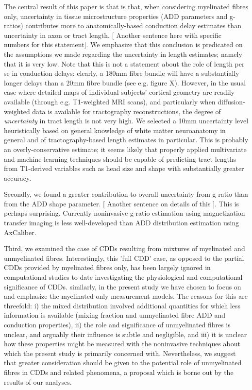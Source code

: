 The central result of this paper is that is that, when considering myelinated fibres only, uncertainty in tissue microstructure properties (ADD parameters and g-ratios) contributes more to anatomically-based conduction delay estimates than uncertainty in axon or tract length. [ Another sentence here with specific numbers for this statement]. We emphasize that this conclusion is predicated on the assumptions we made regarding the uncertainty in length estimates; namely that it is very low. Note that this is not a statement about the role of length per se in conduction delays: clearly, a 180mm fibre bundle will have a substantially longer delays than a 20mm fibre bundle (see e.g. figure X). However, in the usual case where detailed maps of individual subjects' cortical geometry are readily available (through e.g. T1-weighted MRI scans), and particularly when diffusion-weighted data is available for tractography reconstructions, the degree of \textit{uncertainty} in tract length is not very high. We selected a 10mm uncertainty level heuristically based on general knowledge of white matter neuroanatomy in general and of tractography-based length estimates in particular. This is probably an overly-conservative estimate; it seems likely that properly applied multivariate and machine learning techniques should be capable of predicting tract lengths from T1-derived variables such as head size and shape with substantially greater accuracy. 

Secondly, we found a greater contribution to overall uncertainty from g-ratio than from the ADD shape parameter. [ Another sentence on details of this ]. This is perhaps surprising. Currently noninvasive g-ratio estimation using magnetization transfer imaging is less well-developed than ADD distribution estimation using AxCaliber. 

Third, we examined the case of CDDs resulting from mixtures of myelinated and unmyelinated fibres. Interestingly, this 'full CDD' case, as opposed to the partial CDDs provided by myelinated fibres only, has been largely ignored in computational studies to date investigating the physiological and computational significance of CDDs. similarly, in the present study we have chosen to focus on and emphasize the myelinated-only measurement models. The reasons for this are threefold: i) the mixed distribution involved additional quantities for which less information is available (mixing fraction and unmyelinated fibre ADD and conduction properties), ii) the role and significance of unmyelinated fibres is unclear, and arguably their influence is subtle and negligible, and iii) it is unclear how these properties might be measured with the noninvasive techniques about which the present study is primarily concerned with. Nevertheless, we suggest that greater consideration should be given to the potential role of unmyelinated fibres in CDDs and related phenomena, a proposal which is borne out by the results of our analyses. 

